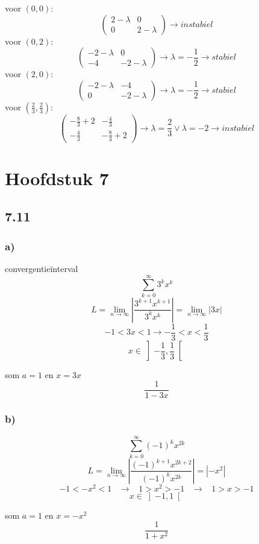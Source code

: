 \documentclass[11pt]{article}
\begin{document}
voor $(0,0)$:
\[
\begin{pmatrix}
2-\lambda & 0 \\
0 & 2-\lambda
\end{pmatrix}
\longrightarrow
instabiel
\]
voor $(0,2)$:
\[
\begin{pmatrix}
-2-\lambda & 0 \\
-4 & -2-\lambda
\end{pmatrix}
\longrightarrow
\lambda = -\frac{1}{2}
\longrightarrow
stabiel
\]
voor $(2,0)$:
\[
\begin{pmatrix}
-2-\lambda & -4 \\
0 & -2-\lambda
\end{pmatrix}
\longrightarrow
\lambda = -\frac{1}{2}
\longrightarrow
stabiel
\]
voor $(\frac{2}{3},\frac{2}{3})$:
\[
\begin{pmatrix}
-\frac{8	}{3}+2 & -\frac{4}{3}\\
-\frac{4}{3} & -\frac{8}{3}+2
\end{pmatrix}
\longrightarrow
\lambda = \frac{2}{3} \vee \lambda=-2
\longrightarrow
instabiel
\]

\section*{Hoofdstuk 7}
\subsection*{7.11}
\subsubsection*{a)}
convergentieïnterval
\[
\sum_{k=0}^{\infty}3^kx^k
\]
\[
L = \lim_{n\rightarrow\infty}\left|\frac{3^{k+1}x^{k+1}}{3^kx^k}\right| = \lim_{n\rightarrow\infty}\left|3x\right|
\]
\[
-1 < 3x < 1 \rightarrow -\frac{1}{3} < x < \frac{1}{3}
\]
\[
x \in \left] -\frac{1}{3},\frac{1}{3} \right[
\]

som $a=1$ en $x=3x$
\[
\frac{1}{1-3x}
\]

\subsubsection*{b)}
\[
\sum_{k=0}^\infty(-1)^kx^{2k}
\]
\[
L 
=
\lim_{n\rightarrow\infty}\left|\frac{(-1)^{k+1}x^{2k+2}}{(-1)^kx^{2k}}\right|
=
|-x^2|
\]
\[
-1 < -x^2 <1 
\;\;\;\longrightarrow\;\;\;
 1>x^2 > -1
 \;\;\;\longrightarrow\;\;\;
 1 > x > -1
\]
\[
x \in \left] -1,1 \right[
\]

som $a=1$ en $x=-x^2$
$$\frac{1}{1+x^2}$$
\end{document}

